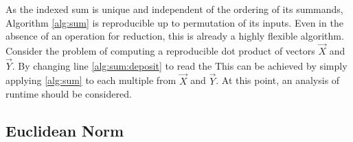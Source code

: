     As the indexed sum is unique and independent of the ordering of its summands, Algorithm \ref{alg:sum} is reproducible up to permutation of its inputs.
    Even in the absence of an operation for reduction, this is already a highly flexible algorithm.
    Consider the problem of computing a reproducible dot product of vectors $\vec{X}$ and $\vec{Y}$. By changing line \ref{alg:sum:deposit} to read
 the This can be achieved by simply applying \ref{alg:sum} to each multiple from $\vec{X}$ and $\vec{Y}$.
    At this point, an analysis of runtime should be considered. 
  \subsection{Euclidean Norm}
    \label{sec:compositeops_nrm}
